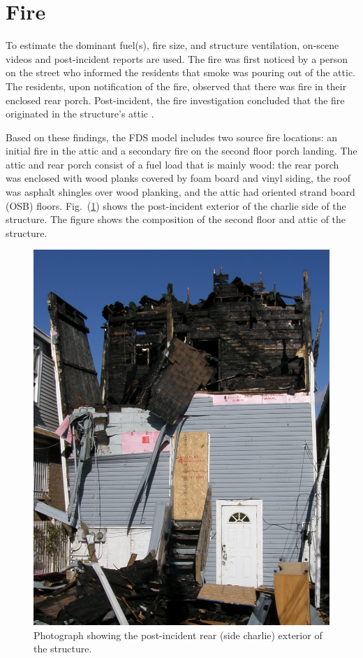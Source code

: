 \documentclass[11pt,oneside]{book}
\begin{document}
\section{Fire}
\label{fire}

To estimate the dominant fuel(s), fire size, and structure ventilation, on-scene videos and post-incident reports are used. The fire was first noticed by a person on the street who informed the residents that smoke was pouring out of the attic. The residents, upon notification of the fire, observed that there was fire in their enclosed rear porch. Post-incident, the fire investigation concluded that the fire originated in the structure's attic \cite{NIOSH:Bowyer}.

Based on these findings, the FDS model includes two source fire locations: an initial fire in the attic and a secondary fire on the second floor porch landing. The attic and rear porch consist of a fuel load that is mainly wood: the rear porch was enclosed with wood planks covered by foam board and vinyl siding, the roof was asphalt shingles over wood planking, and the attic had oriented strand board (OSB) floors. Fig.~(\ref{fig:charlie_ex}) shows the post-incident exterior of the charlie side of the structure. The figure shows the composition of the second floor and attic of the structure. 

\begin{figure}[h!]
\centering
\includegraphics[width=.65\textwidth]{../Figures/exterior_charlie}
\caption{Photograph showing the post-incident rear (side charlie) exterior of the structure.}
\label{fig:charlie_ex}
\end{figure}
\end{document}
